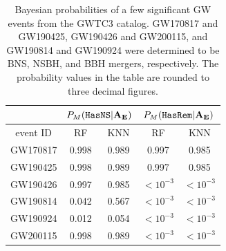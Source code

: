 \begin{table}[]
\begin{tabular}{c|cc|cc}
\hline
\multicolumn{1}{c|}{}      & \multicolumn{2}{c|}{$P_M({{\tt HasNS}}|{\bf A}_{\bf E})$}                                                & \multicolumn{2}{c}{$P_M({{\tt HasRem}}|{\bf A}_{\bf E})$}                                                \\ \hline
\multicolumn{1}{c|}{event ID}   & \multicolumn{1}{c}{RF} & \multicolumn{1}{c}{KNN}  & \multicolumn{1}{c}{RF} & \multicolumn{1}{c}{KNN} \\ \hline
GW170817                                   & 0.998                   & 0.989                    & 0.997                   & 0.985                                  \\
GW190425                                   & 0.998                   & 0.989                    & 0.997                   & 0.985                            \\
GW190426                                   & 0.997                   & 0.985                    & $< 10^{-3}$             & $< 10^{-3}$                    \\
GW190814                                   & 0.042                   & 0.567                   & $< 10^{-3}$              & $< 10^{-3}$                      \\
GW190924                                   & 0.012                   & 0.054                   & $< 10^{-3}$              & $< 10^{-3}$                       \\               
GW200115                                   & 0.998                   & 0.989                   & $< 10^{-3}$              & $< 10^{-3}$                           \\
\hline
\end{tabular}
\caption{Bayesian probabilities of a few significant \ac{GW} events from the \ac{GWTC3} catalog. GW170817 and GW190425, GW190426 and GW200115, and GW190814 and GW190924 were determined to be \ac{BNS}, \ac{NSBH}, and \ac{BBH} mergers, respectively. The probability values in the table are rounded to three decimal figures.}
\label{tab:real_data_bayesian}
\end{table}

